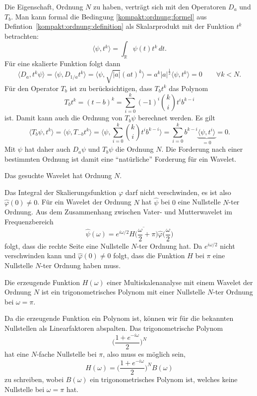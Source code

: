 Die Eigenschaft, Ordnung $N$ zu haben, verträgt sich mit den Operatoren
$D_a$ und $T_b$.
Man kann formal die Bedingung \eqref{kompakt:ordnung:formel} aus
Defintion~\ref{kompakt:ordnung:definition} als Skalarprodukt mit der
Funktion $t^k$ betrachten:
\[
\langle \psi,t^k\rangle = \int_{\mathbb{R}} \psi(t)t^k\,dt.
\]
Für eine skalierte Funktion folgt dann
\[
\langle D_a,t^k\psi\rangle 
=
\langle\psi, D_{1/a}t^k\rangle
=
\langle\psi, \sqrt{|a|}(at)^k\rangle
=
a^k|a|^{\frac12}\langle \psi, t^k\rangle = 0
\qquad
\forall k<N.
\]
Für den Operator $T_b$ ist zu berücksichtigen, dass $T_bt^k$ das
Polynom
\[
T_bt^k
=
(t-b)^k
=
\sum_{i=0}^k (-1)^i \binom{k}{i}t^ib^{k-i}
\]
ist.
Damit kann auch die Ordnung von $T_b\psi$ berechnet werden.
Es gilt
\[
\langle T_b\psi,t^k\rangle
=
\langle \psi,T_{-b}t^k\rangle
=
\biggl\langle \psi, \sum_{i=0}^k \binom{k}{i}t^ib^{k-i}\biggr\rangle
=
\sum_{i=0}^k b^{k-i} \underbrace{\langle \psi, t^i\rangle}_{\displaystyle=0}
=
0.
\]
Mit $\psi$ hat daher auch $D_a\psi$ und $T_b\psi$ die Ordnung $N$.
Die Forderung nach einer bestimmten Ordnung ist damit eine ``natürliche''
Forderung für ein Wavelet.

\begin{forderung}
Das gesuchte Wavelet hat Ordnung $N$.
\end{forderung}

Das Integral der Skalierungsfunktion $\varphi$ darf nicht verschwinden,
es ist also $\hat{\varphi}(0)\ne 0$.
Für ein Wavelet der Ordnung $N$ hat $\hat{\psi}$ bei $0$ eine Nullstelle
$N$-ter Ordnung.
Aus dem Zusammenhang zwischen Vater- und Mutterwavelet im Frequenzbereich
\[
\hat{\psi}(\omega)
=
e^{i\omega/2}
\overline{H\biggl(\frac{\omega}2+\pi\biggr)}
\hat{\varphi}\biggl(\frac{\omega}2\biggr)
\]
folgt, dass die rechte Seite eine Nullstelle $N$-ter Ordnung hat.
Da $e^{i\omega/2}$ nicht verschwinden kann und $\hat{\varphi}(0)\ne 0$ folgt,
dass die Funktion $H$ bei $\pi$ eine Nullstelle $N$-ter
Ordnung haben muss.

\begin{konsequenz}
Die erzeugende Funktion $H(\omega)$ einer Multiskalenanalyse mit einem
Wavelet der Ordnung $N$ ist ein trigonometrisches Polynom mit einer
Nullstelle $N$-ter Ordnung bei $\omega=\pi$.
\end{konsequenz}

Da die erzeugende Funktion ein Polynom ist, können wir für die
bekannten Nullstellen als Linearfaktoren abspalten.
Das trigonometrische Polynom
\[
\biggl(
\frac{1+e^{-i\omega}}{2}
\biggr)^N
\]
hat eine $N$-fache Nullstelle bei $\pi$, also muss es möglich sein,
\begin{equation}
H(\omega)
= 
\biggl(
\frac{1+e^{-i\omega}}{2}
\biggr)^N B(\omega)
\label{buch:kompakt:HB}
\end{equation}
zu schreiben, wobei $B(\omega)$ ein trigonometrisches Polynom ist,
welches keine Nullstelle bei $\omega=\pi$ hat.

